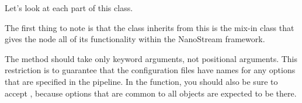 \documentclass[letterpaper,10pt,english]{sphinxmanual}
\begin{document}
%
\begin{sphinxVerbatim}[commandchars=\\\{\}]
   
        
          
          
           

     
         
               
\end{sphinxVerbatim}

Let’s look at each part of this class.

The first thing to note is that the class inherits from  \textendash{} this
is the mix-in class that gives the node all of its functionality within the
NanoStream framework.

The  method should take only keyword arguments, not positional
arguments. This restriction is to guarantee that the configuration files have
names for any options that are specified in the pipeline. In the 
function, you should also be sure to accept , because options that
are common to all  objects are expected to be there.
\end{document}
